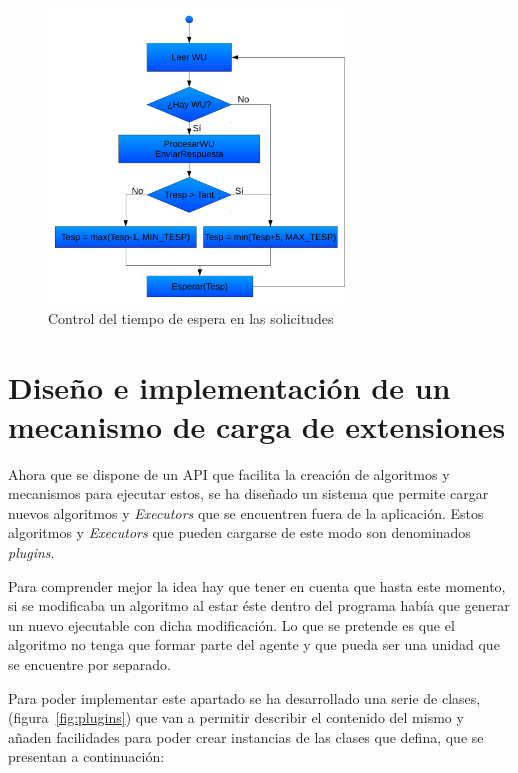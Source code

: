 \begin{figure}
	\centering
	\includegraphics[width=0.7\textwidth]{images/control_tiempo_espera.pdf}
	\caption{Control del tiempo de espera en las solicitudes}\label{fig:control_tiempo_espera}
\end{figure}

\section{Diseño e implementación de un mecanismo de carga de extensiones}

Ahora que se dispone de un API que facilita la creación de algoritmos y mecanismos para ejecutar estos, se ha diseñado un sistema que permite cargar nuevos algoritmos y \emph{Executors} que se encuentren fuera de la aplicación. Estos algoritmos y \emph{Executors} que pueden cargarse de este modo son denominados \emph{plugins}.

Para comprender mejor la idea hay que tener en cuenta que hasta este momento, si se modificaba un algoritmo al estar éste dentro del programa había que generar un nuevo ejecutable con dicha modificación. Lo que se pretende es que el algoritmo no tenga que formar parte del agente y que pueda ser una unidad que se encuentre por separado.

Para poder implementar este apartado se ha desarrollado una serie de clases, (figura~\ref{fig:plugins}) que van a permitir describir el contenido del mismo y añaden facilidades para poder crear instancias de las clases que defina, que se presentan a continuación:

